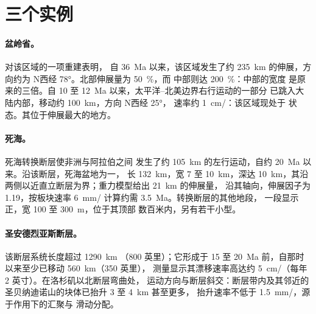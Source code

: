 \begin{omfigure}
\par{}\label{fig:b3:extension-strike-slip:strike-slip}
\end{omfigure}

\section{三个实例}\label{sec:b3:extension-strike-slip:systems}

\paragraph{盆岭省。}对该区域的一项重建表明，
自 \qty{36}{Ma} 以来，该区域发生了约 \qty{235}{km} 的伸展，方向约为
N西经 \ang{78}。北部伸展量为 \qty{50}{\percent}，而
中部则达 \qty{200}{\percent}：中部的宽度
是原来的三倍。自 10 至 \qty{12}{Ma} 以来，太平洋–北美边界右行运动的一部分
已跳入大陆内部，移动约 \qty{100}{km}，方向 N西经 \ang{25}，
速率约 \qty{1}{cm/}：该区域现处于
状态。其位于伸展最大的地方。

\paragraph{死海。}死海转换断层使非洲与阿拉伯之间
发生了约 \qty{105}{km} 的左行运动，自约
\qty{20}{Ma} 以来。沿该断层，死海盆地为一，
长 \qty{132}{km}，宽 7 至 \qty{10}{km}，深达 \qty{10}{km}，其沿
两侧以近直立断层为界；重力模型给出 \qty{21}{km} 的伸展量，
沿其轴向，伸展因子为 1.19，按板块速率
\qty{6}{mm/} 计算约需 \qty{3.5}{Ma}。转换断层的其他地段，
一段显示正，宽 100 至 \qty{300}{m}，位于其顶部
数百米内，另有若干小型。

\paragraph{圣安德烈亚斯断层。}该断层系统长度超过 \qty{1290}{km}
（800 英里）；它形成于 15 至 \qty{20}{Ma} 前，自那时以来至少已移动 \qty{560}{km}（350 英里），
测量显示其漂移速率高达约
\qty{5}{cm/}（每年 2 英寸）。在洛杉矶以北断层弯曲处，
运动方向与断层斜交：断层带内及其邻近的
圣贝纳迪诺山的块体已抬升 3 至 \qty{4}{km} 甚至更多，
抬升速率不低于 \qty{1.5}{mm/}，源于作用下的汇聚与
滑动分配。


